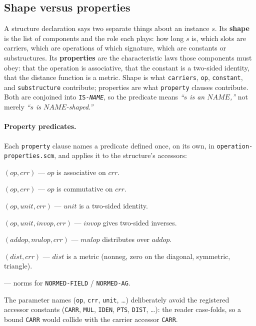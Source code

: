 \subsection{Shape versus properties}
\label{sec:shape-vs-property}

A structure declaration says two separate things about an instance $s$.
Its \textbf{shape} is the list of components and the role each plays: how long
$s$ is, which slots are carriers, which are operations of which
signature, which are constants or substructures.  Its \textbf{properties}
are the characteristic laws those components must obey: that the
operation is associative, that the constant is a two-sided identity, that
the distance function is a metric.  Shape is what \texttt{carriers},
\texttt{op}, \texttt{constant}, and \texttt{substructure} contribute;
properties are what \texttt{property} clauses contribute.  Both are
conjoined into \texttt{IS-\textit{NAME}}, so the predicate means
\emph{``$s$ is an $\mathit{NAME}$,''} not merely \emph{``$s$ is
$\mathit{NAME}$-shaped.''}

\paragraph{Property predicates.}
Each \texttt{property} clause names a predicate defined once, on its own,
in \texttt{operation-properties.scm}, and applies it to the structure's
accessors:
\begin{description}[leftmargin=2.4cm, style=nextline]
\item[\texttt{is-associative}] $(op, crr)$ --- $op$ is associative on $crr$.
\item[\texttt{is-commutative}] $(op, crr)$ --- $op$ is commutative on $crr$.
\item[\texttt{is-identity}] $(op, unit, crr)$ --- $unit$ is a two-sided identity.
\item[\texttt{has-inverses}] $(op, unit, invop, crr)$ --- $invop$ gives two-sided inverses.
\item[\texttt{is-distributive}] $(addop, mulop, crr)$ --- $mulop$ distributes over $addop$.
\item[\texttt{is-metric}] $(dist, crr)$ --- $dist$ is a metric (nonneg, zero on the diagonal, symmetric, triangle).
\item[\texttt{is-norm}, \texttt{is-group-norm}] --- norms for \texttt{NORMED-FIELD} / \texttt{NORMED-AG}.
\end{description}
The parameter names (\texttt{op}, \texttt{crr}, \texttt{unit}, \ldots)
deliberately avoid the registered accessor constants
(\texttt{CARR}, \texttt{MUL}, \texttt{IDEN}, \texttt{PTS}, \texttt{DIST}, \ldots):
the reader case-folds, so a bound \texttt{CARR} would collide with the
carrier accessor \texttt{CARR}.


